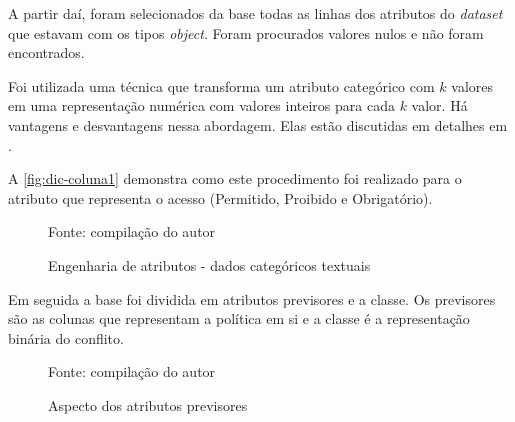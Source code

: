 A partir daí, foram selecionados da base todas as linhas dos atributos do \textit{dataset} que estavam com os tipos \textit{object}. Foram procurados valores nulos e não foram encontrados. 

Foi utilizada uma técnica que transforma um atributo categórico com $k$ valores em uma representação numérica com valores inteiros para cada $k$ valor. Há vantagens e desvantagens nessa abordagem. Elas estão discutidas em detalhes em .

A \autoref{fig:dic-coluna1} demonstra como este procedimento foi realizado para o atributo que representa o acesso (Permitido, Proibido e Obrigatório).

\begin{figure}[h!]
	\centering
	\caption{Engenharia de atributos - dados categóricos textuais}
	
	\label{fig:dic-coluna1}
	{\scriptsize Fonte: compilação do autor}
\end{figure}

Em seguida a base foi dividida em atributos previsores e a classe. Os previsores são as colunas que representam a política em si e a classe é a representação binária do conflito.

\begin{figure}[H]
	\centering
	\caption{Aspecto dos atributos previsores}
	
	\label{fig:previsores}
	{\scriptsize Fonte: compilação do autor}
\end{figure}

